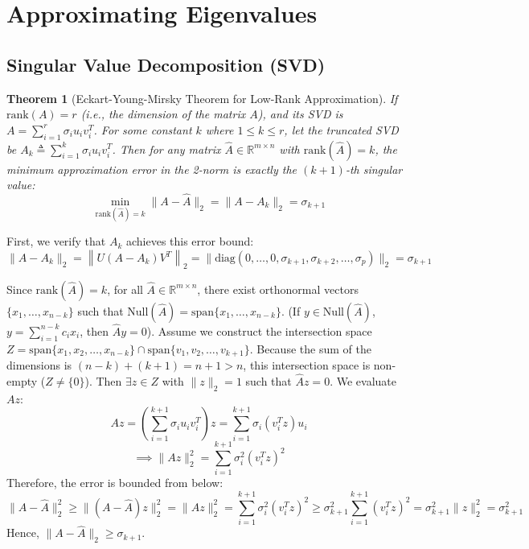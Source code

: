 \documentclass[12pt, a4paper]{article}
\makeatletter
\theoremstyle{break}
\newtheorem{theorem}{Theorem}[section]
\renewenvironment{proof}[1][\proofname]{\par
  \pushQED{\qed}%
  \normalfont \topsep6\p@\@plus6\p@\relax
  \trivlist
  \item[\hskip\labelsep\bfseries #1\@addpunct{.}]\mbox{}\newline\ignorespaces
}{%
  \popQED\endtrivlist\@endpefalse
}
\makeatother
\begin{document}
\section{Approximating Eigenvalues}
\subsection{Singular Value Decomposition (SVD)}

\begin{theorem}[Eckart-Young-Mirsky Theorem for Low-Rank Approximation]
If $\text{rank}(A) = r$ (i.e., the dimension of the matrix $A$), and its SVD is $A = \sum_{i=1}^r \sigma_i u_i v_i^T$.
For some constant $k$ where $1 \le k \le r$, let the truncated SVD be $A_k \triangleq \sum_{i=1}^k \sigma_i u_i v_i^T$.
Then for any matrix $\hat{A} \in \mathbb{R}^{m \times n}$ with $\text{rank}(\hat{A}) = k$, the minimum approximation error in the 2-norm is exactly the $(k+1)$-th singular value:
\begin{equation*}
    \min_{\text{rank}(\hat{A}) = k} \|A - \hat{A}\|_2 = \|A - A_k\|_2 = \sigma_{k+1}
\end{equation*}
\end{theorem}

\begin{proof}
First, we verify that $A_k$ achieves this error bound:
\begin{equation*}
    \|A - A_k\|_2 = \left\| U(A - A_k)V^T \right\|_2 = \|\text{diag}(0, \dots, 0, \sigma_{k+1}, \sigma_{k+2}, \dots, \sigma_p)\|_2 = \sigma_{k+1}
\end{equation*}

Since $\text{rank}(\hat{A}) = k$, for all $\hat{A} \in \mathbb{R}^{m \times n}$, there exist orthonormal vectors $\{x_1, \dots, x_{n-k}\}$ such that $\text{Null}(\hat{A}) = \text{span}\{x_1, \dots, x_{n-k}\}$.
(If $y \in \text{Null}(\hat{A})$, $y = \sum_{i=1}^{n-k} c_i x_i$, then $\hat{A}y = 0$).
Assume we construct the intersection space $Z = \text{span}\{x_1, x_2, \dots, x_{n-k}\} \cap \text{span}\{v_1, v_2, \dots, v_{k+1}\}$.
Because the sum of the dimensions is $(n-k) + (k+1) = n+1 > n$, this intersection space is non-empty ($Z \neq \{0\}$).
Then $\exists z \in Z$ with $\|z\|_2 = 1$ such that $\hat{A}z = 0$.
We evaluate $Az$:
\begin{equation*}
    Az = \left( \sum_{i=1}^{k+1} \sigma_i u_i v_i^T \right) z = \sum_{i=1}^{k+1} \sigma_i (v_i^T z) u_i
\end{equation*}
\begin{equation*}
    \implies \|Az\|_2^2 = \sum_{i=1}^{k+1} \sigma_i^2 (v_i^T z)^2
\end{equation*}
Therefore, the error is bounded from below:
\begin{equation*}
    \|A - \hat{A}\|_2^2 \ge \|(A - \hat{A})z\|_2^2 = \|Az\|_2^2 = \sum_{i=1}^{k+1} \sigma_i^2 (v_i^T z)^2 \ge \sigma_{k+1}^2 \sum_{i=1}^{k+1} (v_i^T z)^2 = \sigma_{k+1}^2 \|z\|_2^2 = \sigma_{k+1}^2
\end{equation*}
Hence, $\|A - \hat{A}\|_2 \ge \sigma_{k+1}$.
\end{proof}
\end{document}
